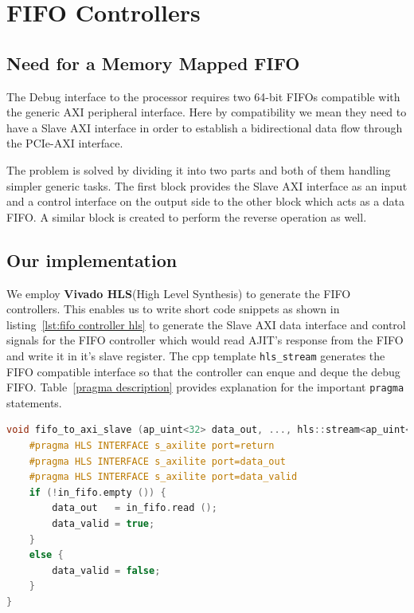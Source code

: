 \section{FIFO Controllers}

\subsection{Need for a Memory Mapped FIFO}

The Debug interface to the processor requires two 64-bit FIFOs compatible with the generic AXI peripheral interface. Here by compatibility
we mean they need to have a Slave AXI interface in order to establish a bidirectional data flow through the PCIe-AXI interface.

The problem is solved by dividing it into two parts and both of them handling simpler generic tasks. The first block provides the Slave AXI
interface as an input and a control interface on the output side to the other block which acts as a data FIFO. A similar block is created to
perform the reverse operation as well.

\subsection{Our implementation}

We employ \textbf{Vivado HLS}(High Level Synthesis) to generate the FIFO controllers. This enables us to write short code snippets as shown
in listing~\ref{lst:fifo controller hls} to generate the Slave AXI data interface and control signals for the FIFO controller which would
read AJIT's response from the FIFO and write it in it's slave register. The cpp template \verb|hls_stream| generates the FIFO compatible
interface so that the controller can enque and deque the debug FIFO.  Table~\ref{pragma description} provides explanation for the important
\verb|pragma| statements.

\scriptsize
\singlespacing
\begin{lstlisting}[language=C++, caption=FIFO Controller HLS, label={lst:fifo controller hls}]
void fifo_to_axi_slave (ap_uint<32> data_out, ..., hls::stream<ap_uint<32> > &in_fifo) {
    #pragma HLS INTERFACE s_axilite port=return
    #pragma HLS INTERFACE s_axilite port=data_out
    #pragma HLS INTERFACE s_axilite port=data_valid
    if (!in_fifo.empty ()) {
        data_out   = in_fifo.read ();
        data_valid = true;
    }
    else {
        data_valid = false;
    }
}
\end{lstlisting}

